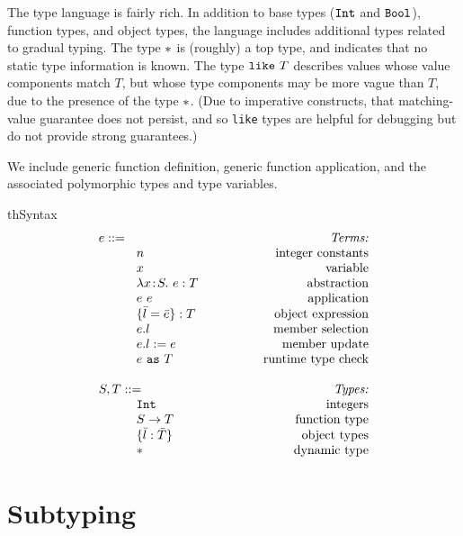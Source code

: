 \documentclass{article}
\newcommand{\lam}[4]{\lambda#1\!:\!#2.\,\,#4:#3}
\newcommand{\lamt}[2]{#1\rightarrow #2}
\newcommand{\app}[2]{#1~#2}
\newcommand{\Int}{\t{Int}}
\newcommand{\Bool}{\t{Bool}}
\newcommand{\dynamic}{\t{*}}
\newcommand{\cast}[2]{#1~\t{as}~#2}
\renewcommand{\t}[1]{{\tt #1}}
\newcommand{\objty}[1]{\{#1\}}
\newcommand{\obje}[2]{\{#1\}:{#2}}
\newcommand{\objget}[2]{#1.#2}
\newcommand{\objset}[3]{#1.#2:=#3}
\newcommand{\wrapty}[1]{\t{wrap}~#1}
\newcommand{\likety}[1]{\t{like}~#1}
\begin{document}
The type language is fairly rich. In addition to  base types ($\Int$ and $\Bool$), function types,
and object types, the language includes additional types related to gradual typing.
The type $\dynamic$ is (roughly) a top type, and indicates that no static type information is known.
The type $\likety{T}$ describes values whose value components match $T$, but whose type components may be more vague than $T$, due to the presence of the type $\dynamic$. (Due to imperative constructs, that matching-value guarantee does not persist, and so \t{like} types are helpful for debugging but do not provide strong guarantees.)

We include generic function definition, generic function application, and the associated polymorphic types and type variables.



\begin{displayfigure}{th}{\label{fig:syntax}Syntax}
\[
\begin{array}{llr}
	\mydefhead{e ::=\qquad\qquad\qquad\qquad\qquad}{Terms:} 
	\mydefcase{n								}{integer constants} 
	\mydefcase{x								}{variable} 
	\mydefcase{\lam{x}{S}{T}{e} 				}{abstraction} 
	\mydefcase{\app{e}{e} 					}{application} 
	\mydefcase{\obje{\bar{l}=\bar{e}}{T}		}{object expression}
	\mydefcase{\objget{e}{l}					}{member selection}
	\mydefcase{\objset{e}{l}{e}				}{member update}
	\mydefcase{\cast{e}{T}					}{runtime type check}
\\
	\mydefhead{S,T::=}{Types:} 
	\mydefcase{\Int 							}{integers}
	\mydefcase{\lamt{S}{T} 					}{function type}
	\mydefcase{\objty{\bar{l}:\bar{T}}	   	}{object types}
	\mydefcase{\dynamic 		    				}{dynamic type}
\end{array}
\]
\end{displayfigure}


\clearpage
\section{Subtyping}
\end{document}

